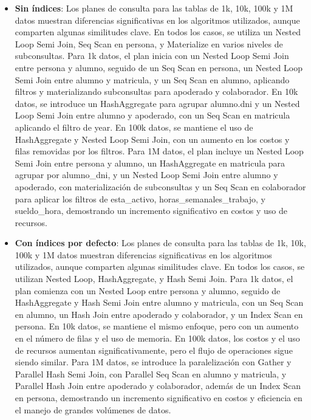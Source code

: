 \begin{itemize}
\begin{itemize}
		      \item {\textbf{Sin índices}: Los planes de consulta para las tablas de 1k, 10k, 100k y 1M datos muestran diferencias significativas en los algoritmos utilizados, aunque comparten algunas similitudes clave. En todos los casos, se utiliza un Nested Loop Semi Join, Seq Scan en persona, y Materialize en varios niveles de subconsultas. Para 1k datos, el plan inicia con un Nested Loop Semi Join entre persona y alumno, seguido de un Seq Scan en persona, un Nested Loop Semi Join entre alumno y matricula, y un Seq Scan en alumno, aplicando filtros y materializando subconsultas para apoderado y colaborador. En 10k datos, se introduce un HashAggregate para agrupar alumno.dni y un Nested Loop Semi Join entre alumno y apoderado, con un Seq Scan en matricula aplicando el filtro de year. En 100k datos, se mantiene el uso de HashAggregate y Nested Loop Semi Join, con un aumento en los costos y filas removidas por los filtros. Para 1M datos, el plan incluye un Nested Loop Semi Join entre persona y alumno, un HashAggregate en matricula para agrupar por alumno\_dni, y un Nested Loop Semi Join entre alumno y apoderado, con materialización de subconsultas y un Seq Scan en colaborador para aplicar los filtros de esta\_activo, horas\_semanales\_trabajo, y sueldo\_hora, demostrando un incremento significativo en costos y uso de recursos.}
		      \item {\textbf{Con índices por defecto}: Los planes de consulta para las tablas de 1k, 10k, 100k y 1M datos muestran diferencias significativas en los algoritmos utilizados, aunque comparten algunas similitudes clave. En todos los casos, se utilizan Nested Loop, HashAggregate, y Hash Semi Join. Para 1k datos, el plan comienza con un Nested Loop entre persona y alumno, seguido de HashAggregate y Hash Semi Join entre alumno y matricula, con un Seq Scan en alumno, un Hash Join entre apoderado y colaborador, y un Index Scan en persona. En 10k datos, se mantiene el mismo enfoque, pero con un aumento en el número de filas y el uso de memoria. En 100k datos, los costos y el uso de recursos aumentan significativamente, pero el flujo de operaciones sigue siendo similar. Para 1M datos, se introduce la paralelización con Gather y Parallel Hash Semi Join, con Parallel Seq Scan en alumno y matricula, y Parallel Hash Join entre apoderado y colaborador, además de un Index Scan en persona, demostrando un incremento significativo en costos y eficiencia en el manejo de grandes volúmenes de datos.}

\end{itemize}
\end{itemize}
